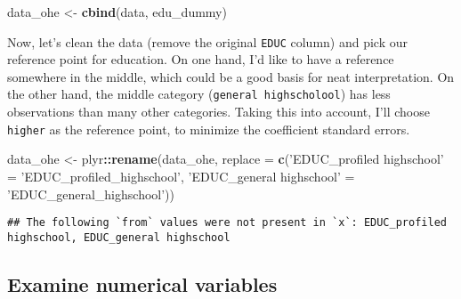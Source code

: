 \documentclass[]{article}
\newenvironment{Shaded}{\begin{snugshade}}{\end{snugshade}}
\newcommand{\CommentTok}[1]{\textcolor[rgb]{0.56,0.35,0.01}{\textit{#1}}}
\newcommand{\DataTypeTok}[1]{\textcolor[rgb]{0.13,0.29,0.53}{#1}}
\newcommand{\KeywordTok}[1]{\textcolor[rgb]{0.13,0.29,0.53}{\textbf{#1}}}
\newcommand{\NormalTok}[1]{#1}
\newcommand{\OperatorTok}[1]{\textcolor[rgb]{0.81,0.36,0.00}{\textbf{#1}}}
\newcommand{\StringTok}[1]{\textcolor[rgb]{0.31,0.60,0.02}{#1}}
\begin{document}
\begin{Shaded}
\begin{Highlighting}[]
\NormalTok{data_ohe <-}\StringTok{ }\KeywordTok{cbind}\NormalTok{(data, edu_dummy)}
\end{Highlighting}
\end{Shaded}

Now, let's clean the data (remove the original \texttt{EDUC} column) and
pick our reference point for education. On one hand, I'd like to have a
reference somewhere in the middle, which could be a good basis for neat
interpretation. On the other hand, the middle category
(\texttt{general\ highscholool}) has less observations than many other
categories. Taking this into account, I'll choose \texttt{higher} as the
reference point, to minimize the coefficient standard errors.

\begin{Shaded}
\begin{Highlighting}[]
\NormalTok{data_ohe <-}\StringTok{ }\NormalTok{plyr}\OperatorTok{::}\KeywordTok{rename}\NormalTok{(data_ohe, }
                         \DataTypeTok{replace =} \KeywordTok{c}\NormalTok{(}\StringTok{'EDUC_profiled highschool'}\NormalTok{ =}\StringTok{ 'EDUC_profiled_highschool'}\NormalTok{,}
                                     \StringTok{'EDUC_general highschool'}\NormalTok{  =}\StringTok{ 'EDUC_general_highschool'}\NormalTok{))}
\end{Highlighting}
\end{Shaded}

\begin{verbatim}
## The following `from` values were not present in `x`: EDUC_profiled highschool, EDUC_general highschool
\end{verbatim}

\begin{Shaded}
\end{Shaded}

\hypertarget{examine-numerical-variables}{%
\subsection{Examine numerical
variables}\label{examine-numerical-variables}}
\end{document}
